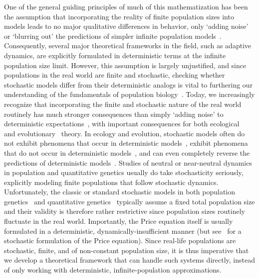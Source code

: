 One of the general guiding principles of much of this mathematization has been the assumption that incorporating the reality of finite population sizes into models leads to no major qualitative differences in behavior, only `adding noise' or `blurring out' the predictions of simpler infinite population models~\citep{page_unifying_2002}. Consequently, several major theoretical frameworks in the field, such as adaptive dynamics, are explicitly formulated in deterministic terms at the infinite population size limit. However, this assumption is largely unjustified, and since populations in the real world are finite and stochastic, checking whether stochastic models differ from their deterministic analogs is vital to furthering our understanding of the fundamentals of population biology~\citep{hastings_transients_2004, coulson_skeletons_2004, shoemaker_integrating_2020}. Today, we increasingly recognize that incorporating the finite and stochastic nature of the real world routinely has much stronger consequences than simply `adding noise' to deterministic expectations~\citep{boettiger_noise_2018}, with important consequences for both ecological~\citep{schreiber_does_2022} and evolutionary~\citep{delong_stochasticity_2023} theory. In ecology and evolution, stochastic models often do not exhibit phenomena that occur in deterministic models~\citep{proulx_what_2005, johansson_will_2006, claessen_delayed_2007,  wakano_evolutionary_2013, debarre_evolutionary_2016, johnson_two-dimensional_2021}, exhibit phenomena that do not occur in deterministic models~\citep{rogers_demographic_2012, rogers_spontaneous_2012, rogers_modes_2015, veller_drift-induced_2017, delong_stochasticity_2023}, and can even completely reverse the predictions of deterministic models~\citep{houchmandzadeh_selection_2012,houchmandzadeh_fluctuation_2015,constable_demographic_2016,mcleod_social_2019}. Studies of neutral or near-neutral dynamics in population and quantitative genetics usually do take stochasticity seriously, explicitly modeling finite populations that follow stochastic dynamics. Unfortunately, the classic or standard stochastic models in both population genetics~\citep{fisher_genetical_1930,wright_evolution_1931, moran_random_1958, kimura_diffusion_1964} and quantitative genetics~\citep{crow_introduction_1970, lande_natural_1976} typically assume a fixed total population size and their validity is therefore rather restrictive since population sizes routinely fluctuate in the real world. Importantly, the Price equation itself is usually formulated in a deterministic, dynamically-insufficient manner (but see~\cite{rice_stochastic_2008} for a stochastic formulation of the Price equation). Since real-life populations are stochastic, finite, and of non-constant population size, it is thus imperative that we develop a theoretical framework that can handle such systems directly, instead of only working with deterministic, infinite-population approximations.

